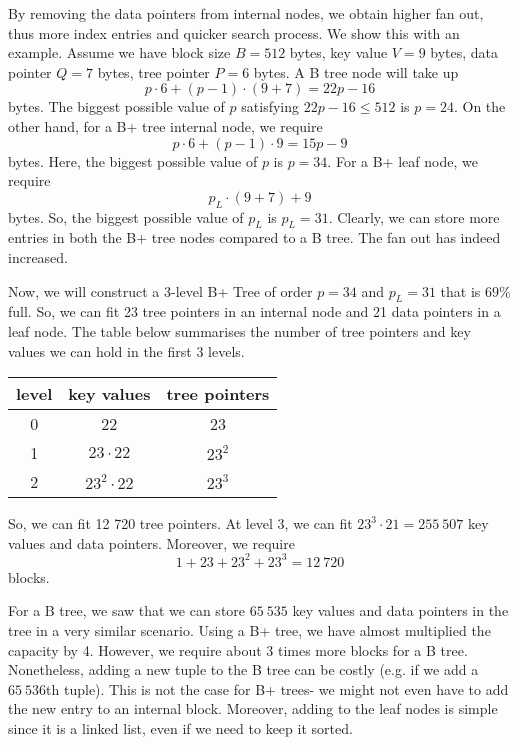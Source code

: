 \documentclass[a4paper, openany]{memoir}
\begin{document}
By removing the data pointers from internal nodes, we obtain higher fan out, thus more index entries and quicker search process. We show this with an example. Assume we have block size $B = 512$ bytes, key value $V = 9$ bytes, data pointer $Q = 7$ bytes, tree pointer $P = 6$ bytes. A B tree node will take up
\[p \cdot 6 + (p-1) \cdot (9+7) = 22p - 16\]
bytes. The biggest possible value of $p$ satisfying $22p - 16 \leq 512$ is $p = 24$. On the other hand, for a B+ tree internal node, we require
\[p \cdot 6 + (p-1) \cdot 9 = 15p - 9\]
bytes. Here, the biggest possible value of $p$ is $p = 34$. For a B+ leaf node, we require
\[p_L \cdot (9 + 7) + 9\]
bytes. So, the biggest possible value of $p_L$ is $p_L = 31$. Clearly, we can store more entries in both the B+ tree nodes compared to a B tree. The fan out has indeed increased.

Now, we will construct a 3-level B+ Tree of order $p = 34$ and $p_L = 31$ that is $69\%$ full. So, we can fit 23 tree pointers in an internal node and 21 data pointers in a leaf node. The table below summarises the number of tree pointers and key values we can hold in the first 3 levels.
\begin{table}[H]
    \centering
    \begin{tabular}{|c|c|c|}
        \hline
        level & key values & tree pointers \\
        \hline
        0 & 22 & 23 \\
        1 & $23 \cdot 22$ & $23^2$ \\
        2 & $23^2 \cdot 22$ & $23^3$ \\
        \hline
    \end{tabular}
\end{table}
\noindent So, we can fit 12 720 tree pointers. At level 3, we can fit $23^3 \cdot 21 = 255 \ 507$ key values and data pointers. Moreover, we require
\[1 + 23 + 23^2 + 23^3 = 12 \ 720\]
blocks.

For a B tree, we saw that we can store $65 \ 535$ key values and data pointers in the tree in a very similar scenario. Using a B+ tree, we have almost multiplied the capacity by 4. However, we require about 3 times more blocks for a B tree. Nonetheless, adding a new tuple to the B tree can be costly (e.g. if we add a $65 \ 536$th tuple). This is not the case for B+ trees- we might not even have to add the new entry to an internal block. Moreover, adding to the leaf nodes is simple since it is a linked list, even if we need to keep it sorted.
\end{document}

